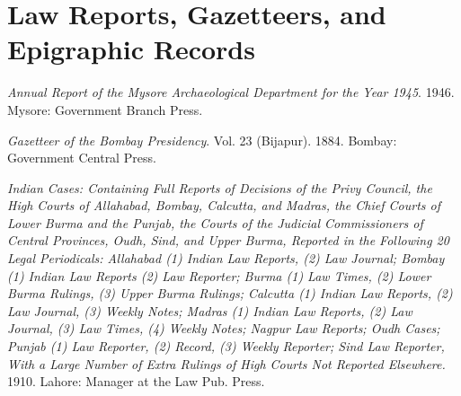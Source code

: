 \section*{Law Reports, Gazetteers, and Epigraphic Records}
\begin{hangparas}{0.125in}{1}

          
          \label{ARMAD}\emph{Annual Report of the Mysore Archaeological Department for the Year 1945}. 1946. Mysore: Government Branch Press.\medskip



          \label{Gazetteer}\emph{Gazetteer of the Bombay Presidency}. Vol. 23 (Bijapur). 1884. Bombay: Government Central Press.\medskip



          \label{IndianCases}\emph{Indian Cases: Containing Full Reports of Decisions of the Privy Council, the High Courts of Allahabad, Bombay, Calcutta, and Madras, the Chief Courts of Lower Burma and the Punjab, the Courts of the Judicial Commissioners of Central Provinces, Oudh, Sind, and Upper Burma, Reported in the Following 20 Legal Periodicals: Allahabad (1) Indian Law Reports, (2) Law Journal; Bombay (1) Indian Law Reports (2) Law Reporter; Burma (1) Law Times, (2) Lower Burma Rulings, (3) Upper Burma Rulings; Calcutta (1) Indian Law Reports, (2) Law Journal, (3) Weekly Notes; Madras (1) Indian Law Reports, (2) Law Journal, (3) Law Times, (4) Weekly Notes; Nagpur Law Reports; Oudh Cases; Punjab (1) Law Reporter, (2) Record, (3) Weekly Reporter; Sind Law Reporter, With a Large Number of Extra Rulings of High Courts Not Reported Elsewhere.} 1910. Lahore: Manager at the Law Pub. Press.\medskip


	
\end{hangparas}

